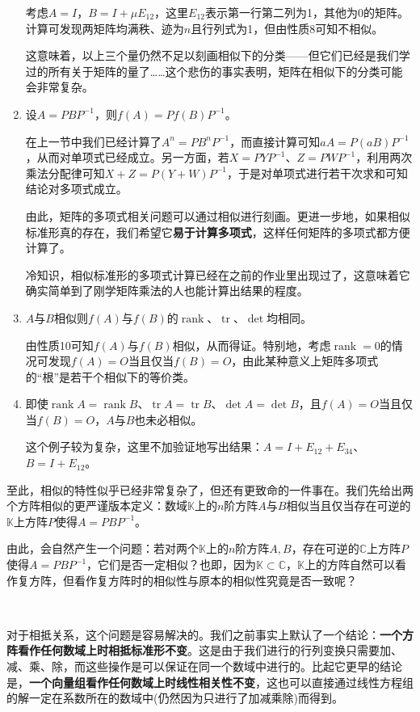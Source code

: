 \documentclass[a4paper,UTF8,fontset=windows]{ctexart}
\DeclareMathOperator{\rank}{rank}
\DeclareMathOperator{\tr}{tr}
\newcommand*{\note}{\noindent *}
\begin{document}
\begin{enumerate}
    考虑$A=I$，$B=I+\mu E_{12}$，这里$E_{12}$表示第一行第二列为1，其他为0的矩阵。计算可发现两矩阵均满秩、迹为$n$且行列式为1，但由性质8可知不相似。

    这意味着，以上三个量仍然不足以刻画相似下的分类——但它们已经是我们学过的所有关于矩阵的量了……这个悲伤的事实表明，矩阵在相似下的分类可能会非常复杂。

    \item 设$A=PBP^{-1}$，则$f(A)=Pf(B)P^{-1}$。
    
    在上一节中我们已经计算了$A^n=PB^nP^{-1}$，而直接计算可知$aA=P(aB)P^{-1}$，从而对单项式已经成立。另一方面，若$X=PYP^{-1}$、$Z=PWP^{-1}$，利用两次乘法分配律可知$X+Z=P(Y+W)P^{-1}$，于是对单项式进行若干次求和可知结论对多项式成立。

    由此，矩阵的多项式相关问题可以通过相似进行刻画。更进一步地，如果相似标准形真的存在，我们希望它\textbf{易于计算多项式}，这样任何矩阵的多项式都方便计算了。

    \note 冷知识，相似标准形的多项式计算已经在之前的作业里出现过了，这意味着它确实简单到了刚学矩阵乘法的人也能计算出结果的程度。

    \item $A$与$B$相似则$f(A)$与$f(B)$的$\rank$、$\tr$、$\det$均相同。
    
    由性质10可知$f(A)$与$f(B)$相似，从而得证。特别地，考虑$\rank=0$的情况可发现$f(A)=O$当且仅当$f(B)=O$，由此某种意义上矩阵多项式的``根''是若干个相似下的等价类。

    \item 即使$\rank A=\rank B$、$\tr A=\tr B$、$\det A=\det B$，且$f(A)=O$当且仅当$f(B)=O$，$A$与$B$也未必相似。
    
    这个例子较为复杂，这里不加验证地写出结果：$A=I+E_{12}+E_{34}$、$B=I+E_{12}$。
\end{enumerate}

至此，相似的特性似乎已经非常复杂了，但还有更致命的一件事在。我们先给出两个方阵相似的更严谨版本定义：数域$\mathbb{K}$上的$n$阶方阵$A$与$B$相似当且仅当存在可逆的$\mathbb{K}$上方阵$P$使得$A=PBP^{-1}$。

由此，会自然产生一个问题：若对两个$\mathbb{K}$上的$n$阶方阵$A,B$，存在可逆的$\mathbb{C}$上方阵$P$使得$A=PBP^{-1}$，它们是否一定相似？也即，因为$\mathbb{K}\subset\mathbb{C}$，$\mathbb{K}$上的方阵自然可以看作复方阵，但看作复方阵时的相似性与原本的相似性究竟是否一致呢？

\

对于相抵关系，这个问题是容易解决的。我们之前事实上默认了一个结论：\textbf{一个方阵看作任何数域上时相抵标准形不变}。这是由于我们进行的行列变换只需要加、减、乘、除，而这些操作是可以保证在同一个数域中进行的。比起它更早的结论是，\textbf{一个向量组看作任何数域上时线性相关性不变}，这也可以直接通过线性方程组的解一定在系数所在的数域中(仍然因为只进行了加减乘除)而得到。
\end{document}
